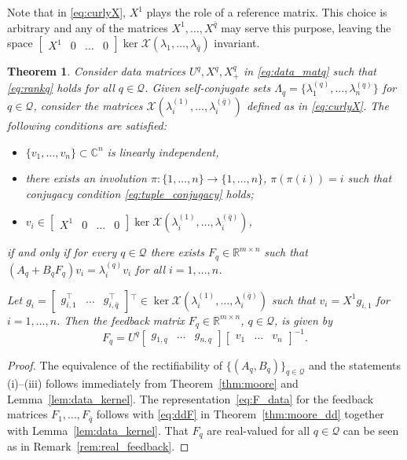 \documentclass[11pt]{article}
\newcommand{\R}{\mathbb{R}}
\newcommand{\C}{\mathbb{C}}
\theoremstyle{plain}
\newtheorem{theorem}{Theorem}
\theoremstyle{definition}
\theoremstyle{remark}
\begin{document}
Note that in \eqref{eq:curlyX}, $X^1$ plays the role of a reference matrix. This choice is arbitrary and any of the matrices $X^1,\dots, X^{\bar q}$ may serve this purpose, leaving the space $\begin{bmatrix} X^1 & 0 & \dots & 0\end{bmatrix} \operatorname{ker}\mathcal X(\lambda_1,\dots, \lambda_{\bar q})$ invariant.

\begin{theorem}
\label{thm:data_rectification}
    Consider data matrices $U^q, X^q, X_+^q$ in \eqref{eq:data_matq} such that \eqref{eq:rankq} holds for all $q\in\mathcal Q$. Given self-conjugate sets $\Lambda_q = \{\lambda_{1}^{(q)},\dots, \lambda_{n}^{(q)}\}$ for $q\in\mathcal Q$, consider the matrices $\mathcal X(\lambda_{i}^{(1)},\dots, \lambda_{i}^{(\bar q)})$ defined as in \eqref{eq:curlyX}. The following conditions are satisfied:
    \begin{itemize}
        \item[\rm (i)] $\{v_1,\dots, v_n\}\subset \C^n$ is linearly independent,
        \item[\rm (ii)] there exists an involution
$\pi:\{1,\ldots,n\}\to\{1,\ldots,n\}$, $\pi(\pi(i))=i$ such that conjugacy condition \eqref{eq:tuple_conjugacy} holds;
        \item[\rm (iii)] $v_i\in \begin{bmatrix}
            X^1 & 0 & \dots & 0
        \end{bmatrix} \ker \mathcal X(\lambda_{i}^{(1)},\dots, \lambda_{i}^{(\bar q)})$,
    \end{itemize}
if and only if for every $q\in\mathcal Q$ there exists $F_q\in\R^{m\times n}$ such that $(A_q+B_qF_q)v_i = \lambda_{i}^{(q)} v_i$ for all $i=1,\dots,n$.

    Let $g_i=\begin{bmatrix}
        g_{i,1}^\top&\dots&g_{i,\bar q}^\top
    \end{bmatrix}{}^\top\in \ker \mathcal X(\lambda_{i}^{(1)},\dots, \lambda_{i}^{(\bar q)})$ such that $v_i=X^1g_{i,1}$ for $i=1,\dots, n$. Then the feedback matrix $F_q\in\mathbb{R}^{m\times n}$, $q\in\mathcal Q$, is given by
    \begin{equation}
    \label{eq:F_data}
    F_q = U^q \begin{bmatrix}
        g_{1,q} & \dots & g_{n,q}
    \end{bmatrix}
        \begin{bmatrix}
            v_1 & \dots & v_n
        \end{bmatrix}^{-1}.
    \end{equation}
\end{theorem}
\begin{proof}
    The equivalence of the rectifiability of $\{(A_q, B_q)\}_{q\in\mathcal Q}$ and the statements (i)--(iii) follows immediately from Theorem~\ref{thm:moore} and Lemma~\ref{lem:data_kernel}. The representation~\eqref{eq:F_data} for the feedback matrices $F_1,\dots, F_{\bar q}$ follows with \eqref{eq:ddF} in Theorem~\ref{thm:moore_dd} together with Lemma~\ref{lem:data_kernel}. That $F_q$ are real-valued for all $q\in\mathcal{Q}$ can be seen as in Remark~\ref{rem:real_feedback}.
\end{proof}
\end{document}
